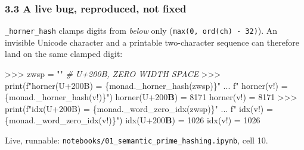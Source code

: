 \documentclass[
  10pt,
]{article}
\newenvironment{Shaded}{}{}
\newcommand{\BuiltInTok}[1]{\textcolor[rgb]{0.00,0.50,0.00}{#1}}
\newcommand{\CommentTok}[1]{\textcolor[rgb]{0.38,0.63,0.69}{\textit{#1}}}
\newcommand{\DecValTok}[1]{\textcolor[rgb]{0.25,0.63,0.44}{#1}}
\newcommand{\ErrorTok}[1]{\textcolor[rgb]{1.00,0.00,0.00}{\textbf{#1}}}
\newcommand{\NormalTok}[1]{#1}
\newcommand{\OperatorTok}[1]{\textcolor[rgb]{0.40,0.40,0.40}{#1}}
\newcommand{\SpecialCharTok}[1]{\textcolor[rgb]{0.25,0.44,0.63}{#1}}
\newcommand{\SpecialStringTok}[1]{\textcolor[rgb]{0.73,0.40,0.53}{#1}}
\newcommand{\StringTok}[1]{\textcolor[rgb]{0.25,0.44,0.63}{#1}}
\begin{document}
\hypertarget{a-live-bug-reproduced-not-fixed}{%
\subsubsection{3.3 A live bug, reproduced, not
fixed}\label{a-live-bug-reproduced-not-fixed}}

\texttt{\_horner\_hash} clamps digits from \emph{below} only
(\texttt{max(0,\ ord(ch)\ -\ 32)}). An invisible Unicode character and a
printable two-character sequence can therefore land on the same clamped
digit:

\begin{Shaded}
\begin{Highlighting}[]
\OperatorTok{\textgreater{}\textgreater{}\textgreater{}}\NormalTok{ zwsp }\OperatorTok{=} \StringTok{"​"}     \CommentTok{\# U+200B, ZERO WIDTH SPACE}
\OperatorTok{\textgreater{}\textgreater{}\textgreater{}} \BuiltInTok{print}\NormalTok{(}\SpecialStringTok{f"horner(U+200B) = }\SpecialCharTok{\{}\NormalTok{monad}\SpecialCharTok{.}\NormalTok{\_horner\_hash(zwsp)}\SpecialCharTok{\}}\SpecialStringTok{"}
\NormalTok{...       }\SpecialStringTok{f"   horner(\textquotesingle{}v!\textquotesingle{}) = }\SpecialCharTok{\{}\NormalTok{monad}\SpecialCharTok{.}\NormalTok{\_horner\_hash(}\StringTok{\textquotesingle{}v!\textquotesingle{}}\NormalTok{)}\SpecialCharTok{\}}\SpecialStringTok{"}\NormalTok{)}
\NormalTok{horner(U}\OperatorTok{+}\DecValTok{200}\ErrorTok{B}\NormalTok{) }\OperatorTok{=} \DecValTok{8171}\NormalTok{   horner(}\StringTok{\textquotesingle{}v!\textquotesingle{}}\NormalTok{) }\OperatorTok{=} \DecValTok{8171}
\OperatorTok{\textgreater{}\textgreater{}\textgreater{}} \BuiltInTok{print}\NormalTok{(}\SpecialStringTok{f"idx(U+200B) = }\SpecialCharTok{\{}\NormalTok{monad}\SpecialCharTok{.}\NormalTok{\_word\_zero\_idx(zwsp)}\SpecialCharTok{\}}\SpecialStringTok{"}
\NormalTok{...       }\SpecialStringTok{f"   idx(\textquotesingle{}v!\textquotesingle{}) = }\SpecialCharTok{\{}\NormalTok{monad}\SpecialCharTok{.}\NormalTok{\_word\_zero\_idx(}\StringTok{\textquotesingle{}v!\textquotesingle{}}\NormalTok{)}\SpecialCharTok{\}}\SpecialStringTok{"}\NormalTok{)}
\NormalTok{idx(U}\OperatorTok{+}\DecValTok{200}\ErrorTok{B}\NormalTok{) }\OperatorTok{=} \DecValTok{1026}\NormalTok{   idx(}\StringTok{\textquotesingle{}v!\textquotesingle{}}\NormalTok{) }\OperatorTok{=} \DecValTok{1026}
\end{Highlighting}
\end{Shaded}

Live, runnable: \texttt{notebooks/01\_semantic\_prime\_hashing.ipynb},
cell 10.
\end{document}
